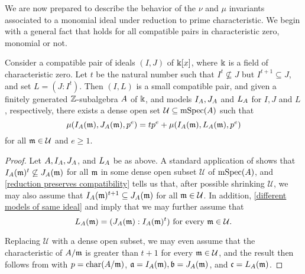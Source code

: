 \documentclass{amsart}
\begin{document}
We are now prepared to describe the behavior of the $\nu$ and $\mu$ invariants associated to a monomial ideal under reduction to prime characteristic.  We begin with a general fact that holds for all compatible pairs in characteristic zero, monomial or not.

\begin{proposition}
\label{general-compatible->smalll: P}
  Consider a compatible pair of ideals $(I,J)$ of $\Bbbk[x]$, where $\Bbbk$ is a field of characteristic zero. Let $t$ be the natural number such that $I^t \not \subseteq J$ but $I^{t+1} \subseteq J$, and set $L=(J: I^t)$.  Then $(I,L)$ is a small compatible pair, and given a finitely generated $\mathbb{Z}$-subalgebra $A$ of $\Bbbk$, and models $I_A, J_A$ and $L_A$ for $I,J$ and $L$, respectively, there exists a dense open set $\mathcal{U} \subseteq \operatorname{mSpec}(A)$ such that
%
\[ \mu(I_A(\mathfrak{m}), J_A(\mathfrak{m}), p^e) = t p^e + \mu(I_A(\mathfrak{m}), L_A(\mathfrak{m}), p^e) \] 
%
for all $\mathfrak{m} \in \mathcal{U}$ and $e \geq 1$.
\end{proposition}

\begin{proof}   Let $A, I_A, J_A$, and $L_A$ be as above.  A standard application of  shows that $I_A(\mathfrak{m})^t \not \subseteq J_A(\mathfrak{m})$ for all $\mathfrak{m}$ in some dense open subset $\mathcal{U}$ of $\operatorname{mSpec}(A)$, and \ref{reduction preserves compatibility} tells us that, after possible shrinking $\mathcal{U}$, we may also assume that $I_A(\mathfrak{m})^{t+1} \subseteq J_A(\mathfrak{m})$ for all $\mathfrak{m} \in \mathcal{U}$. In addition,  \ref{different models of same ideal}
 and  imply that we may further assume that 
 \[ L_A(\mathfrak{m}) = (J_A(\mathfrak{m}) : I_A(\mathfrak{m})^t) \text{ for every $\mathfrak{m} \in \mathcal{U}$}. \] 
 
 Replacing $\mathcal{U}$ with a dense open subset, we may even assume that the characteristic of $A/\mathfrak{m}$ is greater than $t+1$ for every $\mathfrak{m} \in \mathcal{U}$, and the result then follows from  with $p = \operatorname{char}(A/\mathfrak{m})$, $\mathfrak{a} = I_A(\mathfrak{m}), \mathfrak{b} = J_A(\mathfrak{m})$, and $\mathfrak{c} = L_A(\mathfrak{m})$.
 \end{proof}
\end{document}
